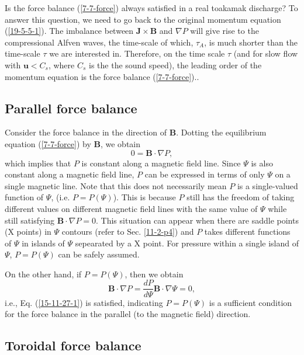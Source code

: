 \documentclass{llncs}
\begin{document}
Is the force balance (\ref{7-7-force}) always satisfied in a real toakamak
discharge? To answer this question, we need to go back to the original
momentum equation (\ref{19-5-5-1}). The imbalance between $\mathbf{J} \times
\mathbf{B}$ and $\nabla P$ will give rise to the compressional Alfven waves,
the time-scale of which, $\tau_A$, is much shorter than the time-scale $\tau$
we are interested in. Therefore, on the time scale $\tau$ (and for slow flow
with $\mathbf{u}< C_s$, where $C_s$ is the the sound speed), the leading order
of the momentum equation is the force balance
(\ref{7-7-force}).{\cite{ysun2012}}.

\subsection{Parallel force balance }

Consider the force balance in the direction of $\mathbf{B}$. Dotting the
equilibrium equation (\ref{7-7-force}) by $\mathbf{B}$, we obtain
\begin{equation}
  \label{15-11-27-1} 0 =\mathbf{B} \cdot \nabla P,
\end{equation}
which implies that $P$ is constant along a magnetic field line. Since $\Psi$
is also constant along a magnetic field line, $P$ can be expressed in terms of
only $\Psi$ on a single magnetic line. Note that this does not necessarily
mean $P$ is a single-valued function of $\Psi$, (i.e. $P = P (\Psi)$). This is
because $P$ still has the freedom of taking different values on different
magnetic field lines with the same value of $\Psi$ while still satisfying
$\mathbf{B} \cdot \nabla P = 0$. This situation can appear when there are
saddle points (X points) in $\Psi$ contours (refer to Sec. \ref{11-2-p4}) and
$P$ takes different functions of $\Psi$ in islands of $\Psi$ sepearated by a X
point. For pressure within a single island of $\Psi$, $P = P (\Psi)$ can be
safely assumed.

On the other hand, if $P = P (\Psi)$, then we obtain
\[ \mathbf{B} \cdot \nabla P = \frac{d P}{d \Psi} \mathbf{B} \cdot \nabla \Psi
   = 0, \]
i.e., Eq. (\ref{15-11-27-1}) is satisfied, indicating $P = P (\Psi)$ is a
sufficient condition for the force balance in the parallel (to the magnetic
field) direction.

\subsection{Toroidal force balance}
\end{document}
